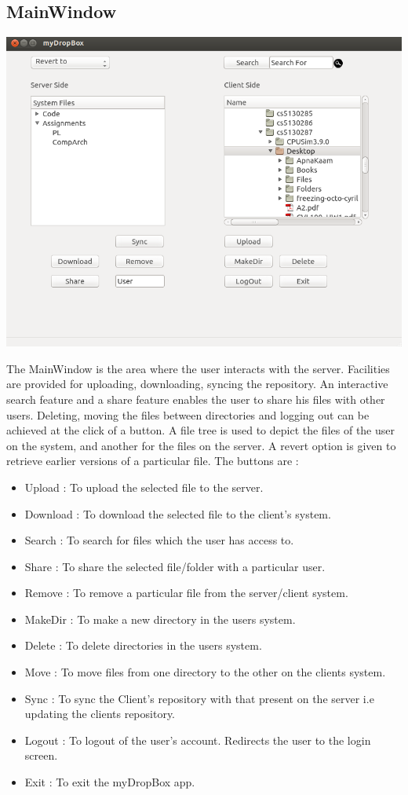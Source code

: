 \documentclass[]{article}
\begin{document}
\subsection{MainWindow}
\begin{center}
\includegraphics[scale=0.4]{images/img_mdb.png}
\end{center}
The MainWindow is the area where the user interacts with the server. Facilities are provided for uploading, downloading, syncing the repository. An interactive search feature and a share feature enables the user to share his files with other users. Deleting, moving the files between directories and logging out can be achieved at the click of a button. A file tree is used to depict the files of the user on the system, and another for the files on the server. A revert option is given to retrieve earlier versions of a particular file.
The buttons are :
\begin{itemize}

\item Upload		: To upload the selected file to the server.
\item Download		: To download the selected file to the client's system.
\item Search		: To search for files which the user has access to. 
\item Share		: To share the selected file/folder with a particular user.
\item Remove		: To remove a particular file from the server/client system.
\item MakeDir	: To make a new directory in the users system.
\item Delete		: To delete directories in the users system.
\item Move		: To move files from one directory to the other on the clients system.
\item Sync		: To sync the Client's repository with that present on the server i.e updating the clients repository.
\item Logout		: To logout of the user's account. Redirects the user to the login screen.
\item Exit		: To exit the myDropBox app.

\end{itemize}
\end{document}
